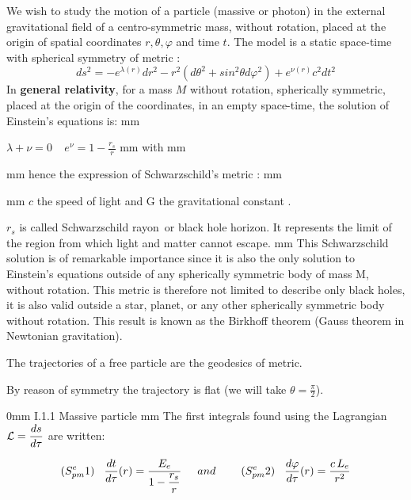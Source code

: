 \documentclass [12pt]{article}
\def\ph#1{\hskip #1}
\def\pv#1{\vskip #1}
\begin{document}
              We wish to study the motion of a particle (massive or photon) in the external gravitational field of a centro-symmetric mass, without rotation,
			placed at the origin of spatial coordinates $r, \theta,\varphi$ and time $t$.
			The model is a static space-time with spherical symmetry of metric :
			$$ds^2= -e^{\lambda(r)}dr^2 -r^2(d\theta^2+sin^2\theta d\varphi^2)+e^{\nu(r)} c^2dt^2$$
			In  {\bf general relativity}, for a mass $M$  without rotation, spherically symmetric, placed at the origin of the coordinates, in an empty space-time, the solution of Einstein's equations is:
		\pv 3mm
			\centerline{$\lambda+\nu=0 \ \ \ \ \  \displaystyle e^\nu=1-\frac{r_s}{r}$ \ph 5mm   with \ph 5mm  }
			\pv 3mm									
			hence the expression of   Schwarzschild's  metric :
	\pv 3mm
			\centerline {}
\pv 3mm   
  $c$  the speed of light  and  G  the gravitational constant .
								
                 $r_s$  is called \og Schwarzschild rayon\fg \, or \og black hole horizon\fg. It represents the limit of the region from which light and matter cannot escape.
         \pv 3mm    
			  This Schwarzschild solution is of remarkable importance since it is also the only solution to Einstein's equations outside of any spherically symmetric body of mass M, without rotation.
			This metric is therefore not limited to describe only black holes, it is also valid outside a star, planet, or any other spherically symmetric body without rotation.  
			This result is known as the Birkhoff theorem (Gauss theorem in Newtonian gravitation).
			 

             
                The trajectories of a free particle are the geodesics of metric. 
								
								By reason of symmetry   the trajectory is flat  (we will take $\theta=\displaystyle\frac{\pi}{2}$).
             
			\pv 20mm
          { I.1.1 Massive particle} 
       \pv 2mm    
		  		    The first integrals found using the Lagrangian $\mathcal L=\displaystyle{ds\over d\tau}$ are written:
       
         $$(S^e_{pm}1)\ph 3mm \displaystyle{dt\over d\tau}(r)={ E_e\over \displaystyle {1- {r_s \over r}}}\ph 5mm  and \ph 5mm \ph 3mm (S^e_{pm}2)\ph 3mm {d\varphi\over d\tau}(r) = {c\,L_e\over r^2}$$
       
\end{document}
